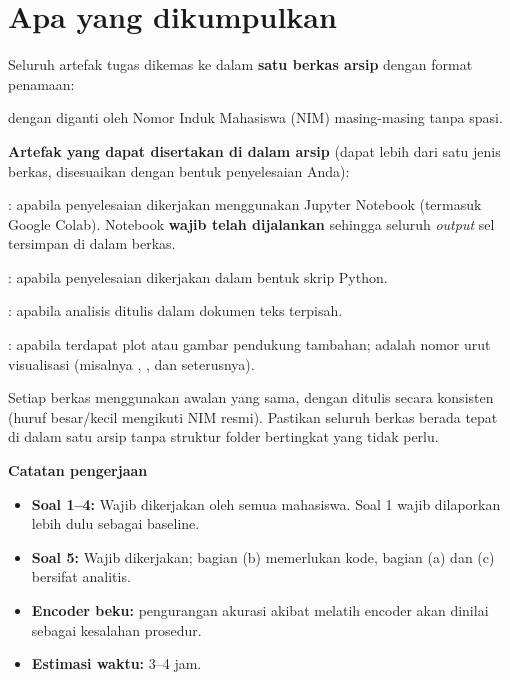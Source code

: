 \documentclass[12pt, a4paper]{article}
\begin{document}
\section{Apa yang dikumpulkan}\label{sec:submit}

Seluruh artefak tugas dikemas ke dalam \textbf{satu berkas arsip} dengan format penamaan:
\begin{center}
\end{center}

dengan  diganti oleh Nomor Induk Mahasiswa (NIM) masing-masing tanpa spasi.

\textbf{Artefak yang dapat disertakan di dalam arsip} (dapat lebih dari satu jenis berkas, disesuaikan dengan bentuk penyelesaian Anda):
\begin{borderedsquare}
  \item {}: apabila penyelesaian dikerjakan menggunakan Jupyter Notebook (termasuk Google Colab). Notebook \textbf{wajib telah dijalankan} sehingga seluruh \emph{output} sel tersimpan di dalam berkas.
  \item {}: apabila penyelesaian dikerjakan dalam bentuk skrip Python.
  \item {}: apabila analisis ditulis dalam dokumen teks terpisah.
  \item {}: apabila terdapat plot atau gambar pendukung tambahan;  adalah nomor urut visualisasi (misalnya , , dan seterusnya).
\end{borderedsquare}

Setiap berkas menggunakan awalan  yang sama, dengan  ditulis secara konsisten (huruf besar/kecil mengikuti NIM resmi). Pastikan seluruh berkas berada tepat di dalam satu arsip  tanpa struktur folder bertingkat yang tidak perlu.

\begin{callout}[ctpBlue]
\textbf{\color{ctpBlue}Catatan pengerjaan}
\begin{itemize}
  \item \textbf{Soal 1--4:} Wajib dikerjakan oleh semua mahasiswa. Soal 1 wajib dilaporkan lebih dulu sebagai baseline.
  \item \textbf{Soal 5:} Wajib dikerjakan; bagian (b) memerlukan kode, bagian (a) dan (c) bersifat analitis.
  \item \textbf{Encoder beku:} pengurangan akurasi akibat melatih encoder akan dinilai sebagai kesalahan prosedur.
  \item \textbf{Estimasi waktu:} 3--4 jam.
\end{itemize}
\end{callout}
\end{document}
